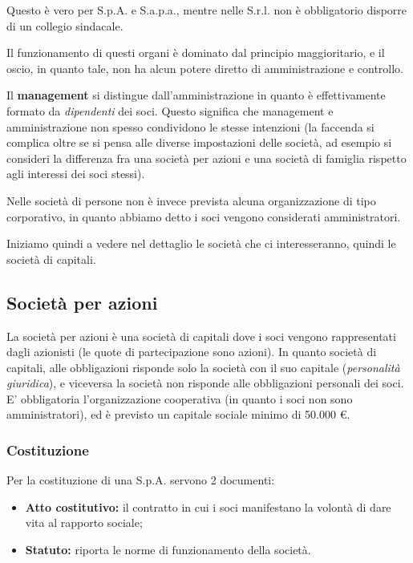 \documentclass[a4paper,11pt]{article}
\begin{document}
Questo è vero per S.p.A. e S.a.p.a., mentre nelle S.r.l. non è obbligatorio disporre di un collegio sindacale.

Il funzionamento di questi organi è dominato dal principio maggioritario, e il oscio, in quanto tale, non ha alcun potere diretto di amministrazione e controllo.

Il \textbf{management} si distingue dall'amministrazione in quanto è effettivamente formato da \textit{dipendenti} dei soci.
Questo significa che management e amministrazione non spesso condividono le stesse intenzioni (la faccenda si complica oltre se si pensa alle diverse impostazioni delle società, ad esempio si consideri la differenza fra una società per azioni e una società di famiglia rispetto agli interessi dei soci stessi).

\par\smallskip

Nelle società di persone non è invece prevista alcuna organizzazione di tipo corporativo, in quanto abbiamo detto i soci vengono considerati amministratori.

\par\medskip

Iniziamo quindi a vedere nel dettaglio le società che ci interesseranno, quindi le società di capitali.

\subsection{Società per azioni}
La società per azioni è una società di capitali dove i soci vengono rappresentati dagli azionisti (le quote di partecipazione sono azioni).
In quanto società di capitali, alle obbligazioni risponde solo la società con il suo capitale (\textit{personalità giuridica}), e viceversa la società non risponde alle obbligazioni personali dei soci.
E' obbligatoria l'organizzazione cooperativa (in quanto i soci non sono amministratori), ed è previsto un capitale sociale minimo di 50.000 €.

\subsubsection{Costituzione}
Per la costituzione di una S.p.A. servono 2 documenti:
\begin{itemize}
	\item \textbf{Atto costitutivo:} il contratto in cui i soci manifestano la volontà di dare vita al rapporto sociale;
	\item \textbf{Statuto:} riporta le norme di funzionamento della società.
\end{itemize}
\end{document}
